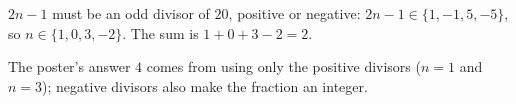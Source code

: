 $2n-1$ must be an odd divisor of $20$, positive or negative: $2n-1\in\{1,-1,5,-5\}$, so $n\in\{1,0,3,-2\}$. The sum is $1+0+3-2=\boxed{2}$.

The poster's answer $4$ comes from using only the positive divisors ($n=1$ and $n=3$); negative divisors also make the fraction an integer.
